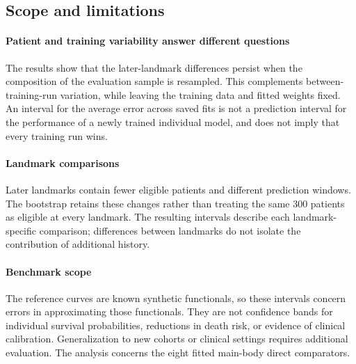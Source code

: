 \subsection{Scope and limitations}
\paragraph{Patient and training variability answer different questions} The results show that the later-landmark differences persist when the composition of the evaluation sample is resampled. This complements between-training-run variation, while leaving the training data and fitted weights fixed. An interval for the average error across saved fits is not a prediction interval for the performance of a newly trained individual model, and does not imply that every training run wins.

\paragraph{Landmark comparisons} Later landmarks contain fewer eligible patients and different prediction windows. The bootstrap retains these changes rather than treating the same 300 patients as eligible at every landmark. The resulting intervals describe each landmark-specific comparison; differences between landmarks do not isolate the contribution of additional history.

\paragraph{Benchmark scope} The reference curves are known synthetic functionals, so these intervals concern errors in approximating those functionals. They are not confidence bands for individual survival probabilities, reductions in death risk, or evidence of clinical calibration. Generalization to new cohorts or clinical settings requires additional evaluation. The analysis concerns the eight fitted main-body direct comparators.

